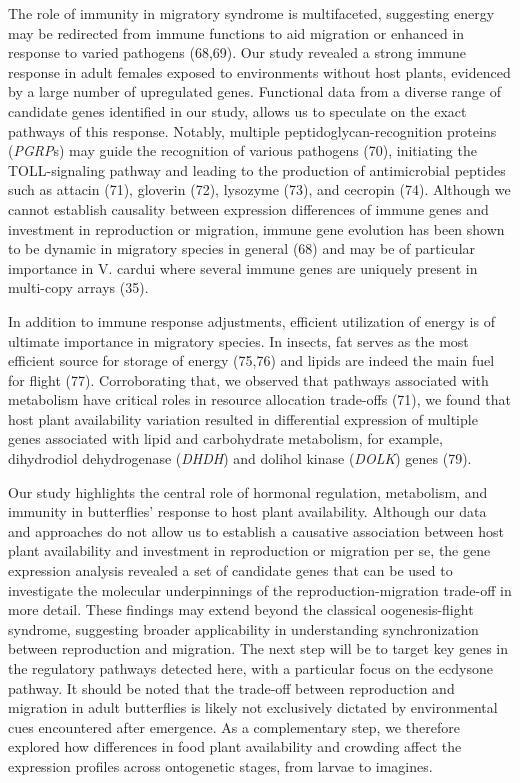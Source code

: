 \documentclass[lineno]{wiley-article}
\begin{document}
The role of immunity in migratory syndrome is multifaceted, suggesting energy may be redirected from immune functions to aid migration or enhanced in response to varied pathogens (68,69). Our study revealed a strong immune response in adult females exposed to environments without host plants, evidenced by a large number of upregulated genes. Functional data from a diverse range of candidate genes identified in our study, allows us to speculate on the exact pathways of this response. Notably, multiple peptidoglycan-recognition proteins (\textit{PGRP}s) may guide the recognition of various pathogens (70), initiating the TOLL-signaling pathway and leading to the production of antimicrobial peptides such as attacin (71), gloverin (72), lysozyme (73), and cecropin (74). Although we cannot establish causality between expression differences of immune genes and investment in reproduction or migration, immune gene evolution has been shown to be dynamic in migratory species in general (68) and may be of particular importance in V. cardui where several immune genes are uniquely present in multi-copy arrays (35). 

In addition to immune response adjustments, efficient utilization of energy is of ultimate importance in migratory species. In insects, fat serves as the most efficient source for storage of energy (75,76) and lipids are indeed the main fuel for flight (77). Corroborating that, we observed that pathways associated with metabolism have critical roles in resource allocation trade-offs (71), we found that host plant availability variation resulted in differential expression of multiple genes associated with lipid and carbohydrate metabolism, for example, dihydrodiol dehydrogenase (\textit{DHDH}) and dolihol kinase (\textit{DOLK}) genes (79). 

Our study highlights the central role of hormonal regulation, metabolism, and immunity in butterflies' response to host plant availability. Although our data and approaches do not allow us to establish a causative association between host plant availability and investment in reproduction or migration per se, the gene expression analysis revealed a set of candidate genes that can be used to investigate the molecular underpinnings of the reproduction-migration trade-off in more detail. These findings may extend beyond the classical oogenesis-flight syndrome, suggesting broader applicability in understanding synchronization between reproduction and migration. The next step will be to target key genes in the regulatory pathways detected here, with a particular focus on the ecdysone pathway. It should be noted that the trade-off between reproduction and migration in adult butterflies is likely not exclusively dictated by environmental cues encountered after emergence. As a complementary step, we therefore explored how differences in food plant availability and crowding affect the expression profiles across ontogenetic stages, from larvae to imagines.
\end{document}
